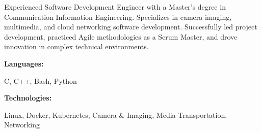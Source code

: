\documentclass[9pt]{developercv} %
\begin{document}
\begin{minipage}[t]{0.46\textwidth}
	\vspace{-6pt}
 
    {Experienced Software Development Engineer with a Master's degree in Communication Information Engineering. Specializes in camera imaging, multimedia, and cloud networking software development.}
    {Successfully led project development, practiced Agile methodologies as a Scrum Master, and drove innovation in complex technical environments.}

\end{minipage}
\hfill %
\begin{minipage}[t]{0.465\textwidth}
    \vspace{-6pt}
    
    \begin{minipage}[t]{0.2\textwidth}
        \textbf{Languages:}
    \end{minipage}
    \hfill
    \begin{minipage}[t]{0.73\textwidth}
      C, C++, Bash, Python
    \end{minipage}
    \vspace{4mm}
    
    \begin{minipage}[t]{0.2\textwidth}
        \textbf{Technologies:}
    \end{minipage}
    \hfill
    \begin{minipage}[t]{0.73\textwidth}
      Linux, Docker, Kubernetes, Camera \& Imaging, Media Transportation, Networking
    \end{minipage}
\end{minipage}

\vspace{10pt}
\end{document}
